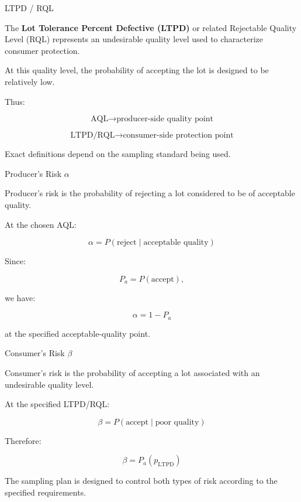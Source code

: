 \documentclass[aspectratio=169,10pt]{beamer}
\begin{document}

\begin{frame}[shrink=18]{LTPD / RQL}
\small

The \textbf{Lot Tolerance Percent Defective (LTPD)} or related
Rejectable Quality Level (RQL) represents an undesirable quality
level used to characterize consumer protection.

At this quality level, the probability of accepting the lot is
designed to be relatively low.

Thus:

\[
\boxed{
\text{AQL}\rightarrow\text{producer-side quality point}
}
\]

\[
\boxed{
\text{LTPD/RQL}\rightarrow\text{consumer-side protection point}
}
\]

Exact definitions depend on the sampling standard being used.

\end{frame}


\begin{frame}[shrink=18]{Producer's Risk \(\alpha\)}
\small

Producer's risk is the probability of rejecting a lot considered
to be of acceptable quality.

At the chosen AQL:

\[
\boxed{
\alpha
=
P(\text{reject}\mid\text{acceptable quality})
}
\]

Since:

\[
P_a=P(\text{accept}),
\]

we have:

\[
\boxed{
\alpha=1-P_a
}
\]

at the specified acceptable-quality point.

\end{frame}


\begin{frame}[shrink=18]{Consumer's Risk \(\beta\)}
\small

Consumer's risk is the probability of accepting a lot associated
with an undesirable quality level.

At the specified LTPD/RQL:

\[
\boxed{
\beta
=
P(\text{accept}\mid\text{poor quality})
}
\]

Therefore:

\[
\boxed{
\beta=P_a(p_{\mathrm{LTPD}})
}
\]

The sampling plan is designed to control both types of risk
according to the specified requirements.

\end{frame}
\end{document}
